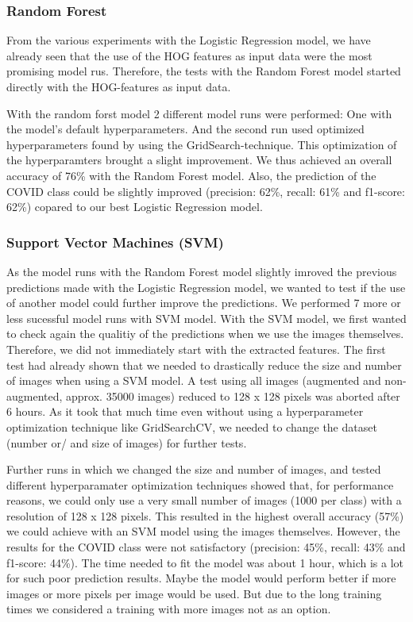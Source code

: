 \documentclass{article}
\begin{document}
\subsubsection{Random Forest}
From the various experiments with the Logistic Regression model, we have already seen that the use of the HOG features as input data were the most promising model rus. Therefore, the tests with the Random Forest model started directly with the HOG-features as input data. 

With the random forst model 2 different model runs were performed: One with the model's default hyperparameters. And the second run used optimized hyperparameters found by using the GridSearch-technique. This optimization of the hyperparamters brought a slight improvement. We thus achieved an overall accuracy of 76\% with the Random Forest model. Also, the prediction of the COVID class could be slightly improved (precision: 62\%, recall: 61\% and f1-score: 62\%) copared to our best Logistic Regression model.


\subsubsection{Support Vector Machines (SVM)}
As the model runs with the Random Forest model slightly imroved the previous predictions made with the Logistic Regression model, we wanted to test if the use of another model could further improve the predictions. We performed 7 more or less sucessful model runs with SVM model. 
With the SVM model, we first wanted to check again the qualitiy of the predictions when we use the images themselves. Therefore, we did not immediately start with the extracted features. The first test had already shown that we needed to drastically reduce the size and number of images when using a SVM model. A test using all images (augmented and non-augmented, approx. 35000 images) reduced to 128 x 128 pixels was aborted after 6 hours. As it took that much time even without using a hyperparameter optimization technique like GridSearchCV, we needed to change the dataset (number or/ and size of images) for further tests. 

Further runs in which we changed the size and number of images, and tested different hyperparamater optimization techniques showed that, for performance reasons, we could only use a very small number of images (1000 per class) with a resolution of 128 x 128 pixels. This resulted in the highest overall accuracy (57\%) we could achieve with an SVM model using the images themselves. However, the results for the COVID class were not satisfactory (precision: 45\%, recall: 43\% and f1-score: 44\%). The time needed to fit the model was about 1 hour, which is a lot for such poor prediction results. Maybe the model would perform better if more images or more pixels per image would be used. But due to the long training times we considered a training with more images not as an option.
\end{document}
